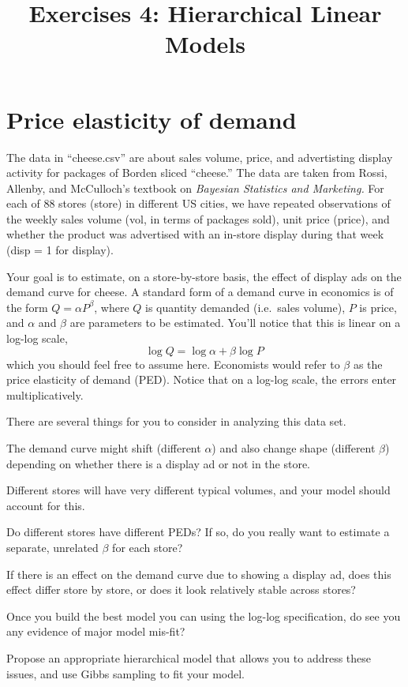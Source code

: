 \documentclass{mynotes}
\title[Exercises 4 $\cdot$ SSC 383D]{Exercises 4: Hierarchical Linear Models}
\date{}  %
\begin{document}
\maketitle%


\section{Price elasticity of demand}

The data in ``cheese.csv'' are about sales volume, price, and advertisting display activity for packages of Borden sliced ``cheese.'' The data are taken from Rossi, Allenby, and McCulloch's textbook on \textit{Bayesian Statistics and Marketing.} For each of 88 stores (store) in different US cities, we have repeated observations of the weekly sales volume (vol, in terms of packages sold), unit price (price), and whether the product was advertised with an in-store display during that week (disp = 1 for display).

Your goal is to estimate, on a store-by-store basis, the effect of display ads on the demand curve for cheese.  A standard form of a demand curve in economics is of the form $Q = \alpha P^\beta$, where $Q$ is quantity demanded (i.e.~sales volume), $P$ is price, and $\alpha$ and $\beta$ are parameters to be estimated.  You'll notice that this is linear on a log-log scale,
$$
\log Q = \log \alpha + \beta \log P \,
$$
which you should feel free to assume here.  Economists would refer to $\beta$ as the price elasticity of demand (PED).  Notice that on a log-log scale, the errors enter multiplicatively.

There are several things for you to consider in analyzing this data set.
\begin{compactenum}
\item The demand curve might shift (different $\alpha$) and also change shape (different $\beta$) depending on whether there is a display ad or not in the store.
\item Different stores will have very different typical volumes, and your model should account for this.
\item Do different stores have different PEDs?  If so, do you really want to estimate a separate, unrelated $\beta$ for each store?
\item If there is an effect on the demand curve due to showing a display ad, does this effect differ store by store, or does it look relatively stable across stores?
\item Once you build the best model you can using the log-log specification, do see you any evidence of major model mis-fit?
\end{compactenum}
Propose an appropriate hierarchical model that allows you to address these issues, and use Gibbs sampling to fit your model.
\end{document}
